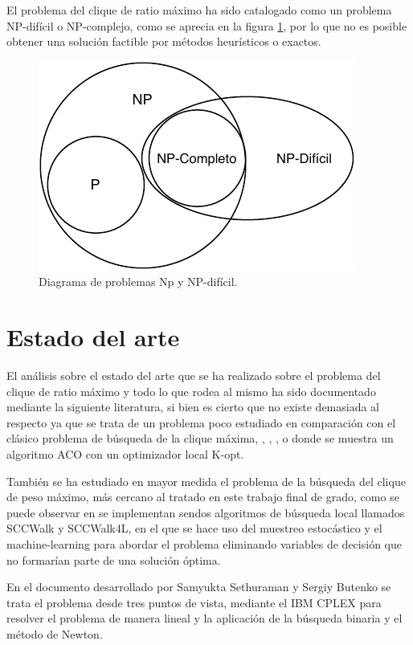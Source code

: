 El problema del clique de ratio máximo ha sido catalogado como un problema NP-difícil o NP-complejo, como se aprecia en la figura \ref{fig:np-dificil}, por lo que no es posible obtener una solución factible por métodos heurísticos o exactos.

\begin{figure}[H]
	\centering
	\includegraphics{Figures/problemas-np-hard.pdf}
	\caption{Diagrama de problemas Np y NP-difícil.}
	\label{fig:np-dificil}
\end{figure}

\section{Estado del arte}
El análisis sobre el estado del arte que se ha realizado sobre el problema del clique de ratio máximo y todo lo que rodea al mismo ha sido documentado mediante la siguiente literatura, si bien es cierto que no existe demasiada al respecto ya que se trata de un problema poco estudiado en comparación con el clásico problema de búsqueda de la clique máxima, \cite{mcp-batsyn}, \cite{mcp-ryp}, \cite{mcp-neuro}, o \cite{mcp-ants} donde se muestra un algoritmo \gls{ACO} con un optimizador local K-opt.

También se ha estudiado en mayor medida el problema de la búsqueda del clique de peso máximo, más cercano al tratado en este trabajo final de grado, como se puede observar en \cite{mwcp-ls} se implementan sendos algoritmos de búsqueda local llamados SCCWalk y SCCWalk4L, \cite{mwcp-ml} en el que se hace uso del muestreo estocástico y el machine-learning para abordar el problema eliminando variables de decisión que no formarían parte de una solución óptima.

En el documento desarrollado por Samyukta Sethuraman  y Sergiy Butenko \cite{mrcp-Sethuraman:2015} se trata el problema desde tres puntos de vista, mediante el IBM CPLEX para resolver el problema de manera lineal y la aplicación de la búsqueda binaria y el método de Newton.

